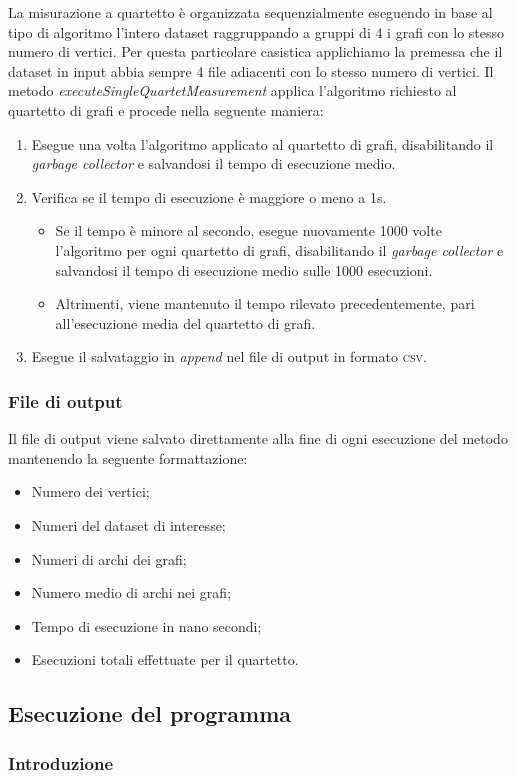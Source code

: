 La misurazione a quartetto è organizzata sequenzialmente eseguendo in base al tipo di algoritmo l'intero dataset raggruppando a gruppi di 4 i grafi con lo stesso numero di vertici. Per questa particolare casistica applichiamo la premessa che il dataset in input abbia sempre 4 file adiacenti con lo stesso numero di vertici. Il metodo \textit{executeSingleQuartetMeasurement} applica l'algoritmo richiesto al quartetto di grafi e procede nella seguente maniera:

\begin{enumerate}
    \item Esegue una volta l'algoritmo applicato al quartetto di grafi, disabilitando il \textit{garbage collector} e salvandosi il tempo di esecuzione medio.
    \item Verifica se il tempo di esecuzione è maggiore o meno a 1s.
    \begin{itemize}
        \item Se il tempo è minore al secondo, esegue nuovamente 1000 volte l'algoritmo per ogni quartetto di grafi, disabilitando il \textit{garbage collector} e salvandosi il tempo di esecuzione medio sulle 1000 esecuzioni.
        \item Altrimenti, viene mantenuto il tempo rilevato precedentemente, pari all'esecuzione media del quartetto di grafi.
    \end{itemize}
    \item Esegue il salvataggio in \textit{append} nel file di output in formato \textsc{csv}.
\end{enumerate}


\subsubsection{File di output}

Il file di output viene salvato direttamente alla fine di ogni esecuzione del metodo mantenendo la seguente formattazione:
\begin{itemize}
    \item Numero dei vertici;
    \item Numeri del dataset di interesse;
    \item Numeri di archi dei grafi;
    \item Numero medio di archi nei grafi;
    \item Tempo di esecuzione in nano secondi;
    \item Esecuzioni totali effettuate per il quartetto.
\end{itemize}


\subsection{Esecuzione del programma}

\subsubsection{Introduzione}